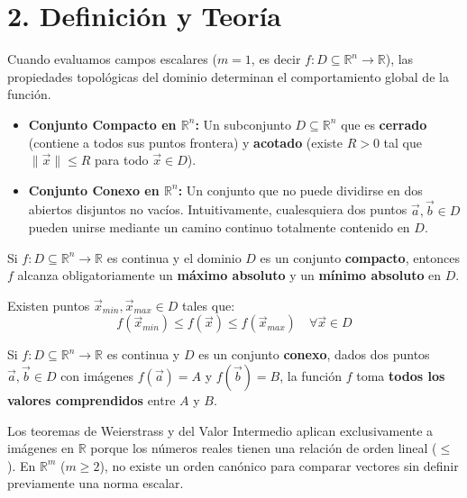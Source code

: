 \documentclass[11pt]{article}
\newenvironment{teoria}{%
  \section*{2. Definición y Teoría}%
}{}
\newenvironment{teorema}[1]{%
  \begin{tcolorbox}[colback=green!5,colframe=green!75!black,title=Teorema: #1]%
}{%
  \end{tcolorbox}%
}
\newenvironment{procesamiento}[1]{%
  \begin{tcolorbox}[colback=gray!5,colframe=gray!60!black,title=Procedimiento: #1]%
}{%
  \end{tcolorbox}%
}
\begin{document}
\begin{teoria}
  Cuando evaluamos campos escalares ($m=1$, es decir $f \colon D \subseteq \mathbb{R}^n \to \mathbb{R}$), las propiedades topológicas del dominio determinan el comportamiento global de la función.

  \begin{itemize}
    \item \textbf{Conjunto Compacto en $\mathbb{R}^n$:} Un subconjunto $D \subseteq \mathbb{R}^n$ que es \textbf{cerrado} (contiene a todos sus puntos frontera) y \textbf{acotado} (existe $R > 0$ tal que $\|\vec{x}\| \le R$ para todo $\vec{x} \in D$).
    \item \textbf{Conjunto Conexo en $\mathbb{R}^n$:} Un conjunto que no puede dividirse en dos abiertos disjuntos no vacíos. Intuitivamente, cualesquiera dos puntos $\vec{a}, \vec{b} \in D$ pueden unirse mediante un camino continuo totalmente contenido en $D$.
  \end{itemize}

  \begin{teorema}{Teorema de Weierstrass en $\mathbb{R}^n$ (Valores Extremos)}
    Si $f \colon D \subseteq \mathbb{R}^n \to \mathbb{R}$ es continua y el dominio $D$ es un conjunto \textbf{compacto}, entonces $f$ alcanza obligatoriamente un \textbf{máximo absoluto} y un \textbf{mínimo absoluto} en $D$.
    
    Existen puntos $\vec{x}_{min}, \vec{x}_{max} \in D$ tales que:
    $$ f(\vec{x}_{min}) \leq f(\vec{x}) \leq f(\vec{x}_{max}) \quad \forall \vec{x} \in D $$
  \end{teorema}

  \begin{teorema}{Teorema del Valor Intermedio en $\mathbb{R}^n$ (TVI)}
    Si $f \colon D \subseteq \mathbb{R}^n \to \mathbb{R}$ es continua y $D$ es un conjunto \textbf{conexo}, dados dos puntos $\vec{a}, \vec{b} \in D$ con imágenes $f(\vec{a}) = A$ y $f(\vec{b}) = B$, la función $f$ toma \textbf{todos los valores comprendidos} entre $A$ y $B$.
  \end{teorema}

  \begin{procesamiento}{¿Por qué $m=1$ para Weierstrass y TVI?}
    Los teoremas de Weierstrass y del Valor Intermedio aplican exclusivamente a imágenes en $\mathbb{R}$ porque los números reales tienen una relación de orden lineal ($\le$). En $\mathbb{R}^m$ ($m \geq 2$), no existe un orden canónico para comparar vectores sin definir previamente una norma escalar.
  \end{procesamiento}

\end{teoria}
\end{document}

